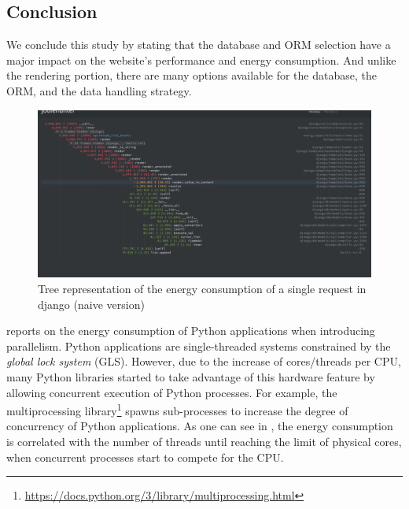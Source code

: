 \subsection{Conclusion}
We conclude this study by stating that the database and ORM selection have a major impact on the website's performance and energy consumption.
And unlike the rendering portion, there are many options available for the database, the ORM, and the data handling strategy.
\begin{figure}[hbt]
    \centering
    \includegraphics[width=\linewidth]{imgs/django_profiled_optimized}
    \caption{Tree representation of the energy consumption of a single request in django (naive version)}
    \label{fig:django_profiled_optimized}
\end{figure}



 reports on the energy consumption of Python applications when introducing parallelism.
Python applications are single-threaded systems constrained by the \emph{global lock system} (GLS).
However, due to the increase of cores/threads per CPU, many Python libraries started to take advantage of this hardware feature by allowing concurrent execution of Python processes.
For example, the multiprocessing library\footnote{\url{https://docs.python.org/3/library/multiprocessing.html}} spawns sub-processes to increase the degree of concurrency of Python applications.
As one can see in , the energy consumption is correlated with the number of threads until reaching the limit of physical cores, when concurrent processes start to compete for the CPU.

